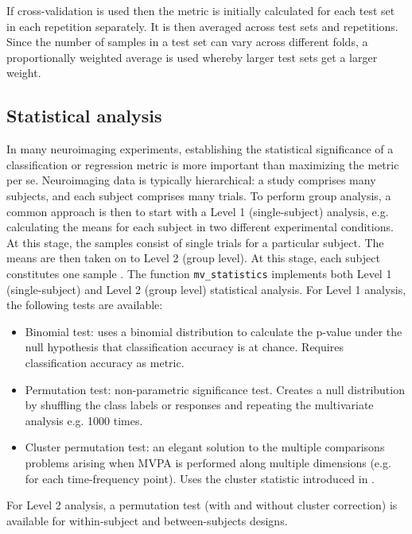 \documentclass[utf8]{frontiersSCNS} %
\newcommand{\ttt}[1]{\texttt{#1}}
\begin{document}
If cross-validation is used then the metric is initially calculated for each test set in each repetition separately. It is then averaged across test sets and repetitions. Since the number of samples in a test set can vary across different folds, a proportionally weighted average is used whereby larger test sets get a larger weight.

\subsection{Statistical analysis}\label{sec:statistics}

In many neuroimaging experiments, establishing the statistical significance of a classification or regression metric is more important than maximizing the metric per se. Neuroimaging data is typically hierarchical: a study comprises many subjects, and each subject comprises many trials. To perform group analysis, a common approach is then to start with a Level 1 (single-subject) analysis, e.g. calculating the means for each subject in two different experimental conditions. At this stage, the samples consist of single trials for a particular subject. The means are then taken on to Level 2 (group level). At this stage, each subject constitutes one sample  \citep{Mumford2007ModelingData}.
The function \ttt{mv\_statistics} implements both Level 1 (single-subject) and Level 2 (group level) statistical analysis. For Level 1 analysis, the following tests are available:

\begin{itemize}
    \item Binomial test: uses a binomial distribution to calculate the p-value under the null hypothesis that classification accuracy is at chance. Requires classification accuracy as metric.
    \item Permutation test: non-parametric significance test. Creates a null distribution by shuffling the class labels or responses and repeating the multivariate analysis e.g. 1000 times.
    \item Cluster permutation test: an elegant solution to the multiple comparisons problems arising when MVPA is performed along multiple dimensions (e.g. for each time-frequency point). Uses the cluster statistic introduced in
    \cite{Maris2007}.
\end{itemize}

For Level 2 analysis, a permutation test (with and without cluster correction) is available for within-subject and between-subjects designs.
\end{document}
